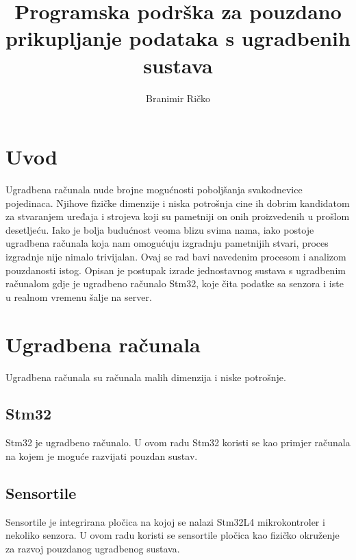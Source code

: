 \documentclass[times, utf8, diplomski]{diplomski}
\begin{document}

\title{Programska podrška za pouzdano prikupljanje podataka s ugradbenih sustava}

\author{Branimir Ričko}

\maketitle


\tableofcontents

\chapter{Uvod}
Ugradbena računala nude brojne mogućnosti poboljšanja svakodnevice pojedinaca. Njihove fizičke dimenzije i niska potrošnja cine ih dobrim kandidatom za stvaranjem uređaja i strojeva koji su pametniji on onih proizvedenih u prošlom desetljeću. Iako je bolja budućnost veoma blizu svima nama, iako postoje ugradbena računala koja nam omogućuju izgradnju pametnijih stvari, proces izgradnje nije nimalo trivijalan. Ovaj se rad bavi navedenim procesom i analizom pouzdanosti istog. Opisan je postupak izrade jednostavnog sustava s ugradbenim računalom gdje je ugradbeno računalo Stm32, koje čita podatke sa senzora i iste u realnom vremenu šalje na server.

\chapter{Ugradbena računala}
Ugradbena računala su računala malih dimenzija i niske potrošnje. 

\section{Stm32}
Stm32\cite{STM32L476JG} je ugradbeno računalo. U ovom radu Stm32 koristi se kao primjer računala na kojem je moguće razvijati pouzdan sustav.

\section{Sensortile}
Sensortile\cite{sensortile} je integrirana pločica na kojoj se nalazi Stm32L4 mikrokontroler i nekoliko senzora. U ovom radu koristi se sensortile pločica kao fizičko okruženje za razvoj pouzdanog ugradbenog sustava.
 
\end{document}
